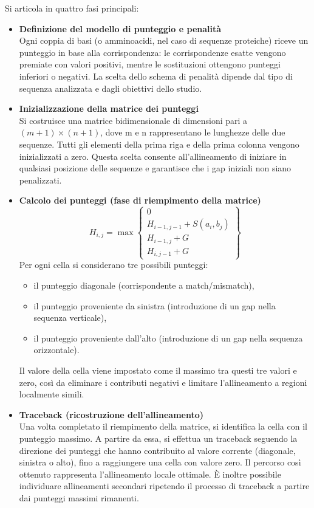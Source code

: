 \documentclass[a4paper,12pt]{article}
\begin{document}
Si articola in quattro fasi principali:
\begin{itemize}
    \item \textbf{Definizione del modello di punteggio e penalità}\\
    Ogni coppia di basi (o amminoacidi, nel caso di sequenze proteiche) riceve un punteggio in base alla corrispondenza: le corrispondenze esatte vengono premiate con valori positivi, mentre le sostituzioni ottengono punteggi inferiori o negativi.
    La scelta dello schema di penalità dipende dal tipo di sequenza analizzata e dagli obiettivi dello studio.

    \item \textbf{Inizializzazione della matrice dei punteggi}\\
    Si costruisce una matrice bidimensionale di dimensioni pari a $(m+1) \times (n+1)$, dove m e n rappresentano le lunghezze delle due sequenze.
    Tutti gli elementi della prima riga e della prima colonna vengono inizializzati a zero.
    Questa scelta consente all'allineamento di iniziare in qualsiasi posizione delle sequenze e garantisce che i gap iniziali non siano penalizzati.

    \item \textbf{Calcolo dei punteggi (fase di riempimento della matrice)}\\
    $$
    H_{i,j} = \max
    \begin{Bmatrix}
    0 \\
    H_{i-1,j-1} + S(a_i, b_j) \\
    H_{i-1,j} + G \\
    H_{i,j-1} + G
    \end{Bmatrix}
    $$
    Per ogni cella si considerano tre possibili punteggi:
    \begin{itemize}
        \item il punteggio diagonale (corrispondente a match/mismatch),
        \item il punteggio proveniente da sinistra (introduzione di un gap nella sequenza verticale),
        \item il punteggio proveniente dall'alto (introduzione di un gap nella sequenza orizzontale).
    \end{itemize}
    Il valore della cella viene impostato come il massimo tra questi tre valori e zero, così da eliminare i contributi negativi e limitare l'allineamento a regioni localmente simili.

    \item \textbf{Traceback (ricostruzione dell'allineamento)}\\
    Una volta completato il riempimento della matrice, si identifica la cella con il punteggio massimo.
    A partire da essa, si effettua un traceback seguendo la direzione dei punteggi che hanno contribuito al valore corrente (diagonale, sinistra o alto), fino a raggiungere una cella con valore zero.
    Il percorso così ottenuto rappresenta l'allineamento locale ottimale.
    È inoltre possibile individuare allineamenti secondari ripetendo il processo di traceback a partire dai punteggi massimi rimanenti.
\end{itemize}
\end{document}
